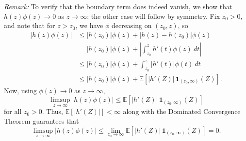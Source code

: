 \documentclass[11pt]{article}
\newcommand{\EE}{\mathbb{E}}
\begin{document}
\begin{enumerate}
        \emph{Remark:} To verify that the boundary term does indeed vanish, we
        show that $h(z) \phi(z) \to 0$ as $z \to \infty$; the other case will
        follow by symmetry.
        Fix $z_0 > 0$, and note that for $z > z_0$, we have $\phi$ decreasing
        on $(z_0, z)$, so \begin{align*}
            |h(z)\phi(z)|
                &\leq |h(z_0)|\phi(z) + |h(z) - h(z_0)| \phi(z) \\
                &= |h(z_0)|\phi(z) + \left|\int_{z_0}^z h'(t) \phi(z) \:dt\right| \\
                &\leq |h(z_0)|\phi(z) + \int_{z_0}^z |h'(t)| \phi(t) \:dt \\
                &\leq |h(z_0)|\phi(z) + \EE[|h'(Z)|\,\bm{1}_{(z_0, \infty)}(Z)].
        \end{align*}
        Now, using $\phi(z) \to 0$ as $z \to \infty$, \[
            \limsup_{z \to \infty} |h(z) \phi(z)|
                \leq \EE[|h'(Z)|\,\bm{1}_{(z_0, \infty)}(Z)]
        \] for all $z_0 > 0$.
        Thus, $\EE[|h'(Z)|] < \infty$ along with the Dominated Convergence
        Theorem guarantees that \[
            \limsup_{z \to \infty} |h(z) \phi(z)|
                \leq \lim_{z_0 \to \infty} \EE[|h'(Z)|\,\bm{1}_{(z_0, \infty)}(Z)]
                = 0.
        \]




\end{enumerate}
\end{document}
